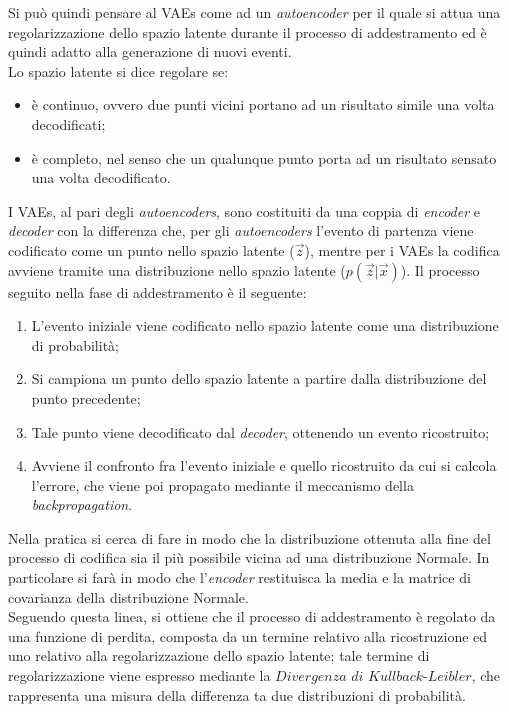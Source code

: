 Si può quindi pensare al VAEs come ad un \textit{autoencoder} per il quale si attua una regolarizzazione dello spazio latente durante il processo di addestramento ed è quindi adatto alla generazione di nuovi eventi. \\
Lo spazio latente si dice regolare se:
\begin{itemize}
	\item è continuo, ovvero due punti vicini portano ad un risultato simile una volta decodificati;
	\item è completo, nel senso che un qualunque punto porta ad un risultato sensato una volta decodificato.  
\end{itemize}
I VAEs, al pari degli \textit{autoencoders}, sono costituiti da una coppia di \textit{encoder} e \textit{decoder} con la differenza che, per gli \textit{autoencoders} l'evento di partenza viene codificato come un punto nello spazio latente ($\vec{z}$), mentre per i VAEs la codifica avviene tramite una distribuzione nello spazio latente ($p(\vec{z}|\vec{x})$). Il processo seguito nella fase di addestramento è il seguente:
\begin{enumerate}
	\item L'evento iniziale viene codificato nello spazio latente come una distribuzione di probabilità;
	\item Si campiona un punto dello spazio latente a partire dalla distribuzione del punto precedente;
	\item Tale punto viene decodificato dal \textit{decoder}, ottenendo un evento ricostruito;
	\item Avviene il confronto fra l'evento iniziale e quello ricostruito da cui si calcola l'errore, che viene poi propagato mediante il meccanismo della \textit{backpropagation}.
\end{enumerate}
Nella pratica si cerca di fare in modo che la distribuzione ottenuta alla fine del processo di codifica sia il più possibile vicina ad una distribuzione Normale. In particolare si farà in modo che l'\textit{encoder} restituisca la media e la matrice di covarianza della distribuzione Normale. \\ 
Seguendo questa linea, si ottiene che il processo di addestramento è regolato da una funzione di perdita, composta da un termine relativo alla ricostruzione ed uno relativo alla regolarizzazione dello spazio latente; tale termine di regolarizzazione viene espresso mediante la $\textit{Divergenza di Kullback-Leibler}$, che rappresenta una misura della differenza ta due distribuzioni di probabilità. \\
